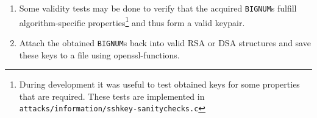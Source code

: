 \begin{enumerate}
\lstset{language=C, numbers=left, numberstyle=\tiny, frame=lines}
\begin{figure}[h] \begin{center}
	\tiny
	\begin{lstlisting}
		/* Already defined in ossl_typ.h */
		/* typedef struct dsa_st DSA; */
		struct dsa_st {
			int pad;
			long version;
			int write_params;
			BIGNUM *p;
			BIGNUM *q;      /* == 20 */
			BIGNUM *g;
			BIGNUM *pub_key;  /* y public key */
			BIGNUM *priv_key; /* x private key */
			int flags;
			const DSA_METHOD *meth;
			ENGINE *engine;
		};
	\end{lstlisting}
	\caption{\texttt{openssl/crypto/dsa/dsa.h}: DSA structure (stripped down)}
	\label{fig:code:dsa-struct}
\end{center}\end{figure}

\lstset{language=C, numbers=left, numberstyle=\tiny, frame=lines}
\begin{figure}[h] \begin{center}
	\tiny
	\begin{lstlisting}
		/* Already declared in ossl_typ.h */
		/* typedef struct bignum_st BIGNUM; */
		struct bignum_st {
			BN_ULONG *d;    /* Pointer to an array of 'BN_BITS2' bit chunks. */
			int top;        /* Index of last used d +1. */
			/* The next are internal book keeping for bn_expand. */
			int dmax;       /* Size of the d array. */
			int neg;        /* one if the number is negative */
			int flags;
		};
	\end{lstlisting}
	\caption{\texttt{openssl/crypto/bn/bn.h}: BIGNUM structure (stripped down)}
	\label{fig:code:bignum-struct}
\end{center}\end{figure}

	\item Some validity tests may be done to verify that the acquired
		\texttt{BIGNUM}s fulfill algorithm-specific
		properties\footnote{During development it was useful to test
		obtained keys for some properties that are required. These tests
		are implemented in
		\texttt{attacks/information/sshkey-sanitychecks.c}} and thus
		form a valid keypair.

	\item Attach the obtained \texttt{BIGNUM}s back into valid RSA or DSA
		structures and save these keys to a file using
		openssl-functions.
	
\end{enumerate}




